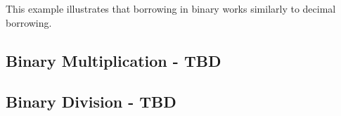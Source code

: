 This example illustrates that borrowing in binary works similarly to decimal borrowing.

\subsection{Binary Multiplication - TBD}
\lipsum[1]

\subsection{Binary Division - TBD}
\lipsum[1]
